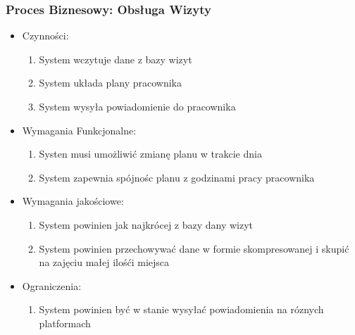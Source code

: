 \documentclass{article}
\begin{document}
	\subsubsection*{Proces Biznesowy: Obsługa Wizyty}
	\begin{itemize}
		\item Czynności:
			\begin{enumerate}
				\item System wczytuje dane z bazy wizyt
				\item System układa plany pracownika
				\item System wysyła powiadomienie do pracownika
			\end{enumerate}
		\item Wymagania Funkcjonalne:
			\begin{enumerate}
				\item Systen musi umożliwić zmianę planu w trakcie dnia
				\item System zapewnia spójnośc planu z godzinami pracy pracownika
			\end{enumerate}
		\item Wymagania jakościowe:
			\begin{enumerate}
				\item System powinien jak najkrócej z bazy dany wizyt
				\item System powinien przechowywać dane w formie skompresowanej i skupić na zajęciu małej ilośći miejsca
			\end{enumerate}
		\item Ograniczenia:
			\begin{enumerate}
				\item System powinien być w stanie wysyłać powiadomienia na róznych platformach
			\end{enumerate}
	\end{itemize}
\end{document}
